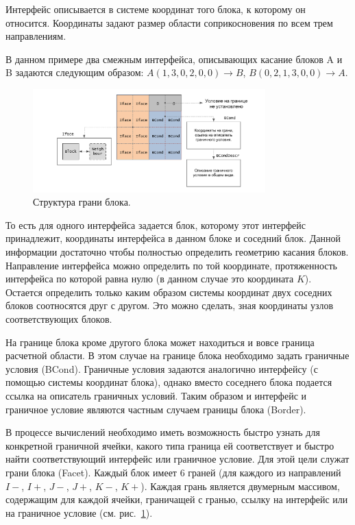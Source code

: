 Интерфейс описывается в системе координат того блока, к которому он относится.
Координаты задают размер области соприкосновения по всем трем направлениям.

В данном примере два смежным интерфейса, описывающих касание блоков A и B задаются следующим образом: $A(1, 3, 0, 2, 0, 0) \rightarrow B$, $B(0, 2, 1, 3, 0, 0) \rightarrow A$.

\begin{figure}[ht]
	\centering
	\includegraphics[width=0.8\textwidth]{./pics/text_2_block/8-facet.pdf}
	\caption{Структура грани блока.}
	\label{fig:text_2_block_facet}
\end{figure}

То есть для одного интерфейса задается блок, которому этот интерфейс принадлежит, координаты интерфейса в данном блоке и соседний блок.
Данной информации достаточно чтобы полностью определить геометрию касания блоков.
Направление интерфейса можно определить по той координате, протяженность интерфейса по которой равна нулю (в данном случае это координата $K$).
Остается определить только каким образом системы координат двух соседних блоков соотносятся друг с другом.
Это можно сделать, зная координаты узлов соответствующих блоков.

На границе блока кроме другого блока может находиться и вовсе граница расчетной области.
В этом случае на границе блока необходимо задать граничные условия (BCond).
Граничные условия задаются аналогично интерфейсу (с помощью системы координат блока), однако вместо соседнего блока подается ссылка на описатель граничных условий.
Таким образом и интерфейс и граничное условие являются частным случаем границы блока (Border).

В процессе вычислений необходимо иметь возможность быстро узнать для конкретной граничной ячейки, какого типа граница ей соответствует и быстро найти соответствующий интерфейс или граничное условие.
Для этой цели служат грани блока (Facet).
Каждый блок имеет 6 граней (для каждого из направлений $I-$, $I+$, $J-$, $J+$, $K-$, $K+$).
Каждая грань является двумерным массивом, содержащим для каждой ячейки, граничащей с гранью, ссылку на интерфейс или на граничное условие (см. рис.~\ref{fig:text_2_block_facet}).

